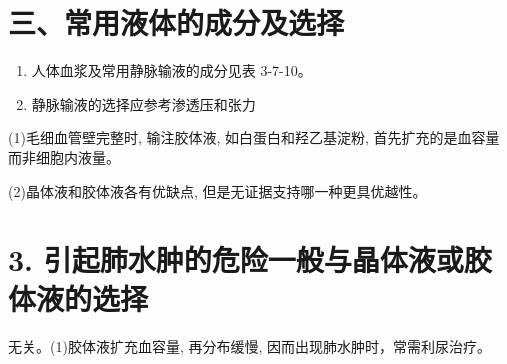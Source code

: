\documentclass[10pt]{article}
\begin{document}
\section*{三、常用液体的成分及选择}
\begin{enumerate}
  \item 人体血浆及常用静脉输液的成分见表 3-7-10。

  \item 静脉输液的选择应参考渗透压和张力

\end{enumerate}

(1)毛细血管壁完整时, 输注胶体液, 如白蛋白和羟乙基淀粉, 首先扩充的是血容量而非细胞内液量。

(2)晶体液和胶体液各有优缺点, 但是无证据支持哪一种更具优越性。

\section*{3. 引起肺水肿的危险一般与晶体液或胶体液的选择}
无关。(1)胶体液扩充血容量, 再分布缓慢, 因而出现肺水肿时，常需利尿治疗。
\end{document}
